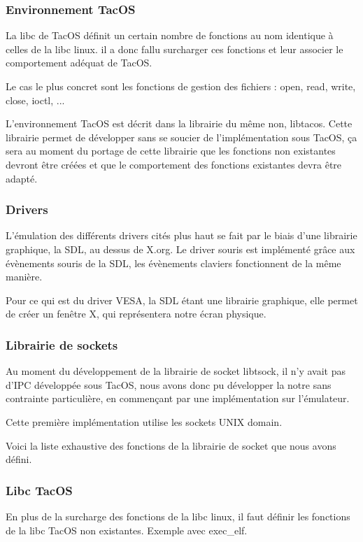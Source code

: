 \subsubsection{Environnement TacOS}

La libc de TacOS définit un certain nombre de fonctions au nom identique à celles de la libc linux. il a donc fallu surcharger ces fonctions et leur associer le comportement adéquat de TacOS.

Le cas le plus concret sont les fonctions de gestion des fichiers : open, read, write, close, ioctl, ...


L'environnement TacOS est décrit dans la librairie du même non, libtacos. Cette librairie permet de développer sans se soucier de l'implémentation sous TacOS, ça sera au moment du portage de cette librairie que les fonctions non existantes devront être créées et que le comportement des fonctions existantes devra être adapté.

\subsubsection{Drivers}

L'émulation des différents drivers cités plus haut se fait par le biais d'une librairie graphique, la SDL, au dessus de X.org. Le driver souris est implémenté grâce aux évènements souris de la SDL, les évènements claviers fonctionnent de la même manière. 

Pour ce qui est du driver VESA, la SDL étant une librairie graphique, elle permet de créer un fenêtre X, qui représentera notre écran physique. 


\subsubsection{Librairie de sockets}

Au moment du développement de la librairie de socket libtsock, il n'y avait pas d'IPC développée sous TacOS, nous avons donc pu développer la notre sans contrainte particulière, en commençant par une implémentation sur l'émulateur. 

Cette première implémentation utilise les sockets UNIX domain.

Voici la liste exhaustive des fonctions de la librairie de socket que nous avons défini.



\subsubsection{Libc TacOS}

En plus de la surcharge des fonctions de la libc linux, il faut définir les fonctions de la libc TacOS non existantes. Exemple avec exec\_elf.

